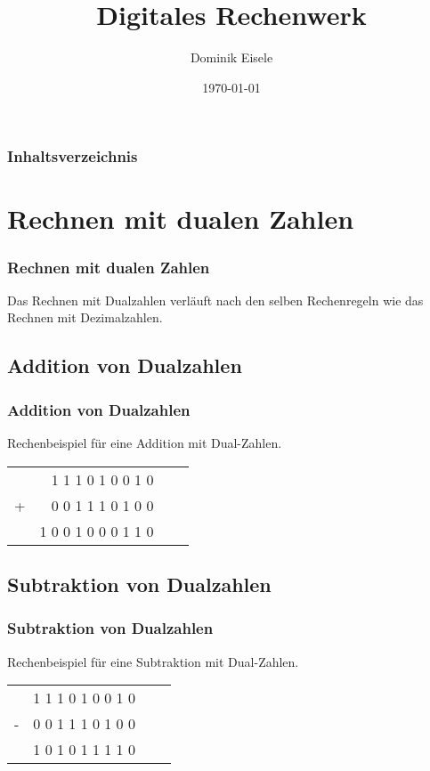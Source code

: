 \documentclass{beamer}
\begin{document}
\title{Digitales Rechenwerk}  
\author{Dominik Eisele}
\date{\today} 

\begin{frame}
	\titlepage
\end{frame} 

\begin{frame}
	\frametitle{Inhaltsverzeichnis}\tableofcontents
\end{frame} 


\section{Rechnen mit dualen Zahlen} 
\begin{frame}
	\frametitle{Rechnen mit dualen Zahlen} 
	Das Rechnen mit Dualzahlen verläuft nach den selben Rechenregeln wie das Rechnen mit Dezimalzahlen.
\end{frame}


\subsection{Addition von Dualzahlen}
\begin{frame} 		
	\frametitle{Addition von Dualzahlen}
	Rechenbeispiel für eine Addition mit Dual-Zahlen.
	\begin{center}
		\begin{tabular}{crcl}
				&		 	       	 1 1 1 0 1 0 0 1 0 		 	  	\\
		 +  		&				 0 0 1 1 1 0 1 0 0			  	\\\hline
				&			      1 0 0 1 0 0 0 1 1 0			  
		\end{tabular}
	\end{center}
\end{frame}




\subsection{Subtraktion von Dualzahlen}
\begin{frame} 		
	\frametitle{Subtraktion von Dualzahlen}
	Rechenbeispiel für eine Subtraktion mit Dual-Zahlen.
	\begin{center}
		\begin{tabular}{crcl}
				&		 	       	  1 1 1 0 1 0 0 1 0 		 	  	\\
		 -  		&				  0 0 1 1 1 0 1 0 0			  	\\\hline
				&			          1 0 1 0 1 1 1 1 0			  
		\end{tabular}
	\end{center}
\end{frame}
\end{document}
